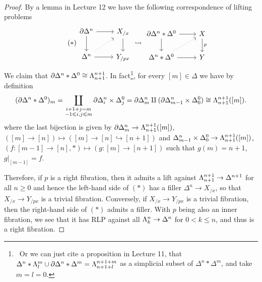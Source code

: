 \documentclass[a4paper,11pt,openany]{scrartcl}
\begin{document}
~\\
\begin{proof}
By a lemma in Lecture 12 we have the following correspondence of lifting problems
\[\tag{$*$}
\begin{tikzcd}
\pa\Delta^n\arrow[r]\arrow[d]& X_{/x}\arrow[d]\\
\Delta^n\arrow[r]\arrow[ur,dotted]& Y_{/px}
\end{tikzcd}
\rightsquigarrow
\begin{tikzcd}
\pa\Delta^n*\Delta^0\arrow[r]\arrow[d]& X\arrow[d,"p"]\\
\Delta^n*\Delta^0\arrow[r]\arrow[ur,dotted]& Y
\end{tikzcd}
\]
We claim that $\partial\Delta^n*\Delta^0\cong\Lambda^{n+1}_{n+1}$. In fact\footnote{\ Or we can just cite a proposition in Lecture 11, that $\Delta^n*\Lambda^m_l\cup\partial\Delta^n*\Delta^m=\Lambda^{n+1+m}_{n+1+l}$ as a simplicial subset of $\Delta^n*\Delta^m$, and take $m=l=0$.}, for every $[m]\in\Delta$ we have by definition
\[
(\partial\Delta^n*\Delta^0)_m=\coprod_{\substack{i+1+j=m\\ -1\leqslant i,j\leqslant m}}\partial\Delta^n_i\times\Delta^0_j=\partial\Delta^n_m\amalg(\partial\Delta^n_{m-1}\times\Delta^0_0)\cong\Lambda^{n+1}_{n+1}([m]).
\]
where the last bijection is given by $\partial\Delta^n_m\to\Lambda^{n+1}_{n+1}([m])$, $([m]\to[n])\mapsto([m]\to[n]\hookrightarrow[n+1])$ and $\Delta^n_{m-1}\times\Delta^0_0\to\Lambda^{n+1}_{n+1}([m])$, $(f\colon[m-1]\to[n],*)\mapsto(g\colon[m]\to[n+1])$ such that $g(m)=n+1$, $g|_{[m-1]}=f$.

Therefore, if $p$ is a right fibration, then it admits a lift against $\Lambda^{n+1}_{n+1}\to\Delta^{n+1}$ for all $n\geqslant0$ and hence the left-hand side of $(*)$ has a filler $\Delta^n\to X_{/x}$, so that $X_{/x}\to Y_{/px}$ is a trivial fibration. Conversely, if $X_{/x}\to Y_{/px}$ is a trivial fibration, then the right-hand side of $(*)$ admits a filler. With $p$ being also an inner fibration, we see that it has RLP against all $\Lambda^n_k\to\Delta^n$ for $0<k\leqslant n$, and thus is a right fibration.
\end{proof}
\end{document}
